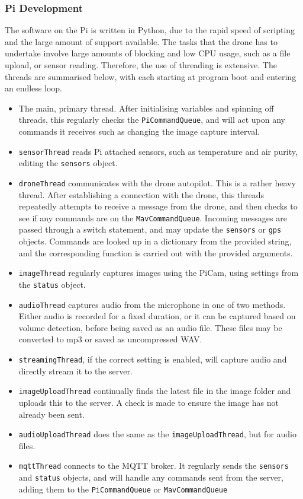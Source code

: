 \documentclass{article}
\begin{document}
\subsubsection{Pi Development}\label{PiDevelopment}
The software on the Pi is written in Python, due to the rapid speed of scripting and the large amount of support available. The tasks that the drone has to undertake involve large amounts of blocking and low CPU usage, such as a file upload, or sensor reading. Therefore, the use of threading is extensive. The threads are summarised below, with each starting at program boot and entering an endless loop. 
\begin{itemize}
	\item The main, primary thread. After initialising variables and spinning off threads, this regularly checks the \texttt{PiCommandQueue}, and will act upon any commands it receives such as changing the image capture interval.
	\item \texttt{sensorThread} reads Pi attached sensors, such as temperature and air purity, editing the \texttt{sensors} object.
	\item \texttt{droneThread} communicates with the drone autopilot. This is a rather heavy thread. After establishing a connection with the drone, this threads repeatedly attempts to receive a message from the drone, and then checks to see if any commands are on the \texttt{MavCommandQueue}. Incoming messages are passed through a switch statement, and may update the \texttt{sensors} or \texttt{gps} objects. Commands are looked up in a dictionary from the provided string, and the corresponding function is carried out with the provided arguments. 
	\item \texttt{imageThread} regularly captures images using the PiCam, using settings from the \texttt{status} object.
	\item \texttt{audioThread} captures audio from the microphone in one of two methods. Either audio is recorded for a fixed duration, or it can be captured based on volume detection, before being saved as an audio file. These files may be converted to mp3 or saved as uncompressed WAV.
	\item \texttt{streamingThread}, if the correct setting is enabled, will capture audio and directly stream it to the server.
	\item \texttt{imageUploadThread} continually finds the latest file in the image folder and uploads this to the server. A check is made to ensure the image has not already been sent.
	\item \texttt{audioUploadThread} does the same as the \texttt{imageUploadThread}, but for audio files.
	\item \texttt{mqttThread} connects to the MQTT broker. It regularly sends the \texttt{sensors} and \texttt{status} objects, and will handle any commands sent from the server, adding them to the \texttt{PiCommandQueue} or \texttt{MavCommandQueue}
\end{itemize}
\end{document}
